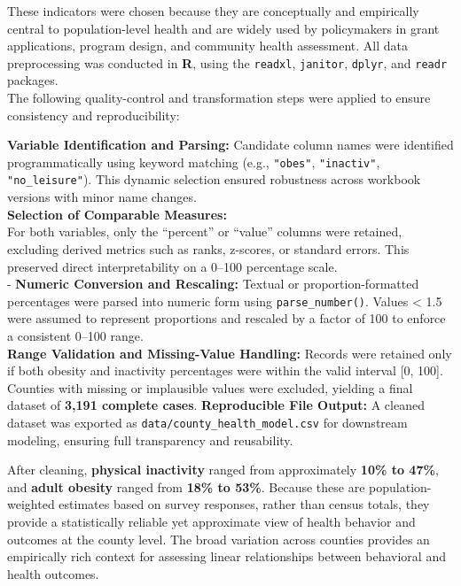 \documentclass[
  letterpaper,
  DIV=11,
  numbers=noendperiod]{scrartcl}
\begin{document}
These indicators were chosen because they are conceptually and
empirically central to population-level health and are widely used by
policymakers in grant applications, program design, and community health
assessment. All data preprocessing was conducted in \textbf{R}, using
the \texttt{readxl}, \texttt{janitor}, \texttt{dplyr}, and
\texttt{readr} packages.\\
The following quality-control and transformation steps were applied to
ensure consistency and reproducibility:

\textbf{Variable Identification and Parsing:} Candidate column names
were identified programmatically using keyword matching (e.g.,
\texttt{"obes"}, \texttt{"inactiv"}, \texttt{"no\_leisure"}). This
dynamic selection ensured robustness across workbook versions with minor
name changes.\\
\textbf{Selection of Comparable Measures:}\\
For both variables, only the ``percent'' or ``value'' columns were
retained, excluding derived metrics such as ranks, z-scores, or standard
errors. This preserved direct interpretability on a 0--100 percentage
scale.\\
- \textbf{Numeric Conversion and Rescaling:} Textual or
proportion-formatted percentages were parsed into numeric form using
\texttt{parse\_number()}. Values \textless{} 1.5 were assumed to
represent proportions and rescaled by a factor of 100 to enforce a
consistent 0--100 range.\\
\textbf{Range Validation and Missing-Value Handling:} Records were
retained only if both obesity and inactivity percentages were within the
valid interval {[}0, 100{]}. Counties with missing or implausible values
were excluded, yielding a final dataset of \textbf{3,191 complete
cases}. \textbf{Reproducible File Output:} A cleaned dataset was
exported as \texttt{data/county\_health\_model.csv} for downstream
modeling, ensuring full transparency and reusability.

After cleaning, \textbf{physical inactivity} ranged from approximately
\textbf{10\% to 47\%}, and \textbf{adult obesity} ranged from
\textbf{18\% to 53\%}. Because these are population-weighted estimates
based on survey responses, rather than census totals, they provide a
statistically reliable yet approximate view of health behavior and
outcomes at the county level. The broad variation across counties
provides an empirically rich context for assessing linear relationships
between behavioral and health outcomes.
\end{document}

